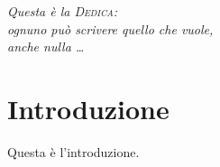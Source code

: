 \documentclass[12pt,a4paper,openright,twoside]{report}
\begin{document}
\begin{titlepage}                       %
%
\thispagestyle{empty}                   %
\topmargin=6.5cm                        %
\raggedleft                             %
\large                                  %
\em                                     %
Questa \`e la \textsc{Dedica}:\\
ognuno pu\`o scrivere quello che vuole, \\
anche nulla \ldots                      %
\newpage                                %
%
\clearpage{\pagestyle{empty}\cleardoublepage}%
\end{titlepage}
\chapter*{Introduzione}                 %
Questa \`e l'introduzione.
\clearpage{\pagestyle{empty}\cleardoublepage}
\tableofcontents                        %
\rhead[\fancyplain{}{\bfseries\leftmark}]{\fancyplain{}{\bfseries\thepage}}
\clearpage{\pagestyle{empty}\cleardoublepage}
\listoffigures                          %
\clearpage{\pagestyle{empty}\cleardoublepage}
\listoftables                           %
\clearpage{\pagestyle{empty}\cleardoublepage}
\end{document}
